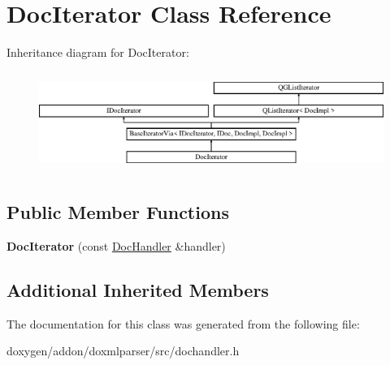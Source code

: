 \hypertarget{class_doc_iterator}{}\section{Doc\+Iterator Class Reference}
\label{class_doc_iterator}
Inheritance diagram for Doc\+Iterator\+:\begin{figure}[H]
\begin{center}
\leavevmode
\includegraphics[height=3.294118cm]{class_doc_iterator}
\end{center}
\end{figure}
\subsection*{Public Member Functions}
\begin{DoxyCompactItemize}
\item 
\mbox{\label{class_doc_iterator_a3eee4da05588b73261a6cb7da7c8742b}} 
{\bfseries Doc\+Iterator} (const \mbox{\hyperlink{class_doc_handler}{Doc\+Handler}} \&handler)
\end{DoxyCompactItemize}
\subsection*{Additional Inherited Members}


The documentation for this class was generated from the following file\+:\begin{DoxyCompactItemize}
\item 
doxygen/addon/doxmlparser/src/dochandler.\+h\end{DoxyCompactItemize}
